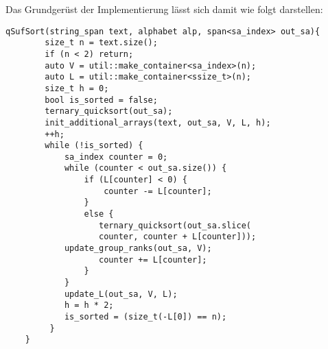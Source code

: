 Das Grundgerüst der Implementierung lässt sich damit wie folgt darstellen:\\
\newpage
\begin{samepage}
\begin{verbatim}
qSufSort(string_span text, alphabet alp, span<sa_index> out_sa){
        size_t n = text.size();
        if (n < 2) return;  
        auto V = util::make_container<sa_index>(n);
        auto L = util::make_container<ssize_t>(n);           
        size_t h = 0;
        bool is_sorted = false;
        ternary_quicksort(out_sa);
        init_additional_arrays(text, out_sa, V, L, h);
        ++h;
        while (!is_sorted) {
            sa_index counter = 0;
            while (counter < out_sa.size()) {
                if (L[counter] < 0) {
                    counter -= L[counter];
                }
                else {
                   ternary_quicksort(out_sa.slice(
                   counter, counter + L[counter]));
           	update_group_ranks(out_sa, V);
                   counter += L[counter];
                }
            }
            update_L(out_sa, V, L);
            h = h * 2;
            is_sorted = (size_t(-L[0]) == n);
         }
    }
\end{verbatim}
\end{samepage}

